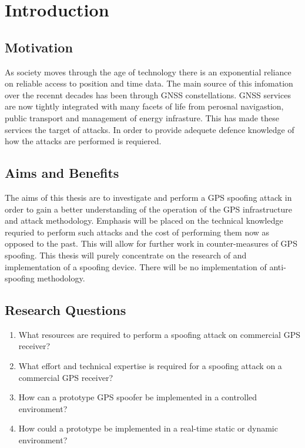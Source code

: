 
\chapter{Introduction}\label{chapter:firstchapter} %

\label{Chapter1} %

\section{Motivation}\label{sec:Motivation}


As society moves through the age of technology there is an exponential reliance on reliable access to position and time data. The main source of this infomation over the
recennt decades has been through GNSS constellations. GNSS services are now tightly integrated with many facets of life from perosnal navigastion, public transport and
management of
energy infrasture. This has made these services the target of attacks. In order to provide adequete defence knowledge of how the attacks are performed is requiered.

\section{Aims and Benefits}\label{sec:Aims}
The aims of this thesis are to investigate and perform a GPS spoofing attack in order to gain a better understanding of the operation of the GPS infrastructure and attack
methodology. Emphasis will be placed on the technical knowledge requried to perform such attacks and the cost of performing them now as opposed to the past. This will
allow for further work in counter-measures of GPS spoofing.
This thesis will purely concentrate on the research of and implementation of a spoofing device. There will be no implementation of anti-spoofing methodology.
\section{Research Questions}\label{sec:RQs}
\begin{enumerate}
    \item What resources are required to perform a spoofing attack on commercial GPS receiver?
    \item What effort and technical expertise is required for a spoofing attack on a commercial GPS receiver?
    \item How can a prototype GPS spoofer be implemented in a controlled environment?
    \item How could a prototype be implemented in a real-time static or dynamic environment? 
\end{enumerate}

